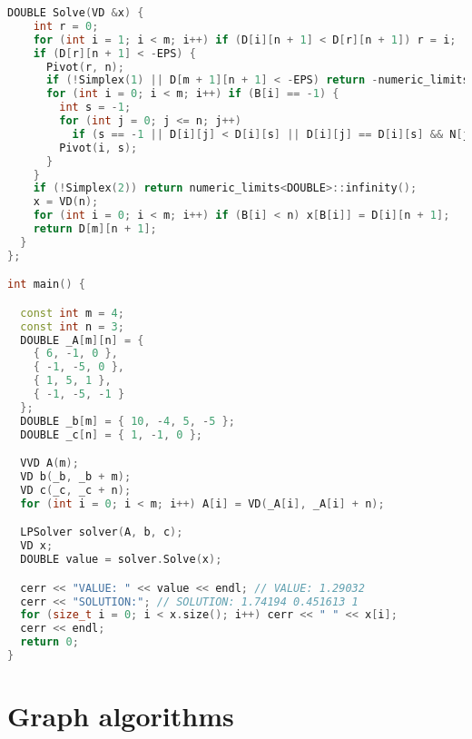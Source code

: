 \begin{lstlisting}[language=C++]
  DOUBLE Solve(VD &x) {
    int r = 0;
    for (int i = 1; i < m; i++) if (D[i][n + 1] < D[r][n + 1]) r = i;
    if (D[r][n + 1] < -EPS) {
      Pivot(r, n);
      if (!Simplex(1) || D[m + 1][n + 1] < -EPS) return -numeric_limits<DOUBLE>::infinity();
      for (int i = 0; i < m; i++) if (B[i] == -1) {
        int s = -1;
        for (int j = 0; j <= n; j++)
          if (s == -1 || D[i][j] < D[i][s] || D[i][j] == D[i][s] && N[j] < N[s]) s = j;
        Pivot(i, s);
      }
    }
    if (!Simplex(2)) return numeric_limits<DOUBLE>::infinity();
    x = VD(n);
    for (int i = 0; i < m; i++) if (B[i] < n) x[B[i]] = D[i][n + 1];
    return D[m][n + 1];
  }
};

int main() {

  const int m = 4;
  const int n = 3;
  DOUBLE _A[m][n] = {
    { 6, -1, 0 },
    { -1, -5, 0 },
    { 1, 5, 1 },
    { -1, -5, -1 }
  };
  DOUBLE _b[m] = { 10, -4, 5, -5 };
  DOUBLE _c[n] = { 1, -1, 0 };

  VVD A(m);
  VD b(_b, _b + m);
  VD c(_c, _c + n);
  for (int i = 0; i < m; i++) A[i] = VD(_A[i], _A[i] + n);

  LPSolver solver(A, b, c);
  VD x;
  DOUBLE value = solver.Solve(x);

  cerr << "VALUE: " << value << endl; // VALUE: 1.29032
  cerr << "SOLUTION:"; // SOLUTION: 1.74194 0.451613 1
  for (size_t i = 0; i < x.size(); i++) cerr << " " << x[i];
  cerr << endl;
  return 0;
}

\end{lstlisting}
\section{Graph algorithms}
